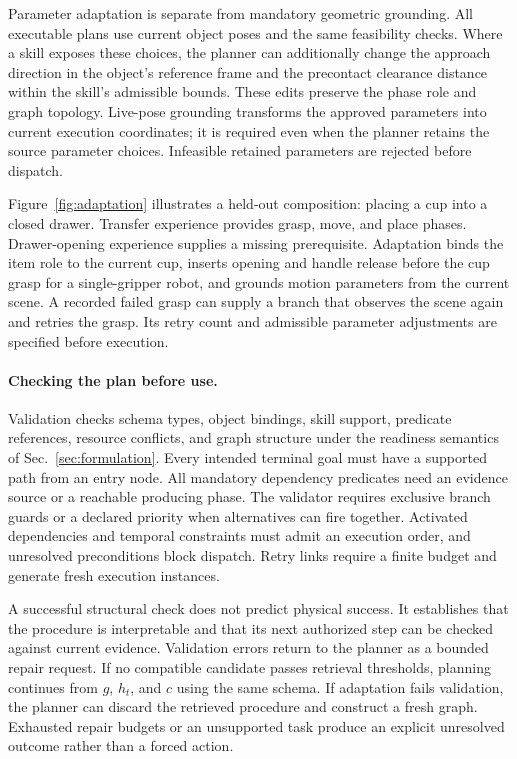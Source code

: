 Parameter adaptation is separate from mandatory geometric grounding. All executable plans use current object poses and the same feasibility checks. Where a skill exposes these choices, the planner can additionally change the approach direction in the object's reference frame and the precontact clearance distance within the skill's admissible bounds. These edits preserve the phase role and graph topology. Live-pose grounding transforms the approved parameters into current execution coordinates; it is required even when the planner retains the source parameter choices. Infeasible retained parameters are rejected before dispatch.

Figure~\ref{fig:adaptation} illustrates a held-out composition: placing a cup into a closed drawer. Transfer experience provides grasp, move, and place phases. Drawer-opening experience supplies a missing prerequisite. Adaptation binds the item role to the current cup, inserts opening and handle release before the cup grasp for a single-gripper robot, and grounds motion parameters from the current scene. A recorded failed grasp can supply a branch that observes the scene again and retries the grasp. Its retry count and admissible parameter adjustments are specified before execution.

\paragraph{Checking the plan before use.}
Validation checks schema types, object bindings, skill support, predicate references, resource conflicts, and graph structure under the readiness semantics of Sec.~\ref{sec:formulation}. Every intended terminal goal must have a supported path from an entry node. All mandatory dependency predicates need an evidence source or a reachable producing phase. The validator requires exclusive branch guards or a declared priority when alternatives can fire together. Activated dependencies and temporal constraints must admit an execution order, and unresolved preconditions block dispatch. Retry links require a finite budget and generate fresh execution instances.

A successful structural check does not predict physical success. It establishes that the procedure is interpretable and that its next authorized step can be checked against current evidence. Validation errors return to the planner as a bounded repair request. If no compatible candidate passes retrieval thresholds, planning continues from $g$, $h_t$, and $c$ using the same schema. If adaptation fails validation, the planner can discard the retrieved procedure and construct a fresh graph. Exhausted repair budgets or an unsupported task produce an explicit unresolved outcome rather than a forced action.

